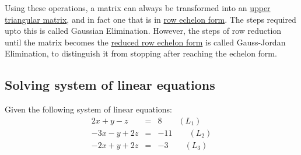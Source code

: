 \documentclass[conference,final,11pt,technote,onecolumn]{IEEEtran}\usepackage[]{graphicx}\usepackage[]{color}
\begin{document}
Using these operations, a matrix can always be transformed into an \hyperref[term:triangular_matrix]{upper triangular matrix}, and in fact one that is in \hyperref[term:row_echelon_form]{row echelon form}. The steps required upto this is called Gaussian Elimination. However, the steps of row reduction until the matrix becomes the \hyperref[term:row_echelon_form]{reduced row echelon form} is called Gauss-Jordan Elimination, to distinguish it from stopping after reaching the echelon form.

\subsection{Solving system of linear equations}
\label{term:gauss_jordan_elimination_algorithm_solve_systems}
Given the following system of linear equations:
\begin{eqnarray}
2x + y - z &=& 8\qquad (L_1)\\
-3x -y + 2z &=& -11 \qquad (L_2)\\
-2x + y + 2z &=& -3 \qquad (L_3)
\end{eqnarray}
\end{document}
